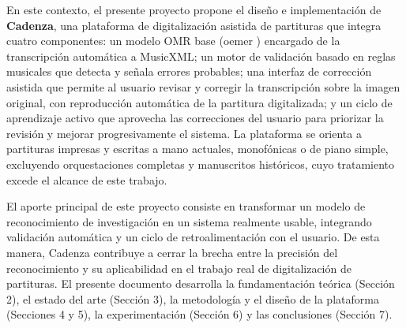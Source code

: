 En este contexto, el presente proyecto propone el dise\~no e
implementaci\'on de \textbf{Cadenza}, una plataforma de digitalizaci\'on
asistida de partituras que integra cuatro componentes: un modelo OMR base
(oemer \cite{oemer2021}) encargado de la transcripci\'on autom\'atica a
MusicXML; un motor de validaci\'on basado en reglas musicales que detecta y
se\~nala errores probables; una interfaz de correcci\'on asistida que
permite al usuario revisar y corregir la transcripci\'on sobre la imagen
original, con reproducci\'on autom\'atica de la partitura digitalizada; y un ciclo
de aprendizaje activo que aprovecha las correcciones
del usuario para priorizar la revisi\'on y mejorar progresivamente el
sistema. La plataforma se orienta a partituras impresas y escritas a mano
actuales, monof\'onicas o de piano simple, excluyendo orquestaciones
completas y manuscritos hist\'oricos, cuyo tratamiento excede el alcance de
este trabajo.

El aporte principal de este proyecto consiste en transformar un modelo de
reconocimiento de investigaci\'on en un sistema realmente usable,
integrando validaci\'on autom\'atica y un ciclo de retroalimentaci\'on con
el usuario. De esta manera, Cadenza contribuye a cerrar la brecha entre la
precisi\'on del reconocimiento y su aplicabilidad en el trabajo real de
digitalizaci\'on de partituras. El presente documento desarrolla la
fundamentaci\'on te\'orica (Secci\'on 2), el estado del arte (Secci\'on 3),
la metodolog\'ia y el dise\~no de la plataforma (Secciones 4 y 5), la
experimentaci\'on (Secci\'on 6) y las conclusiones (Secci\'on 7).

